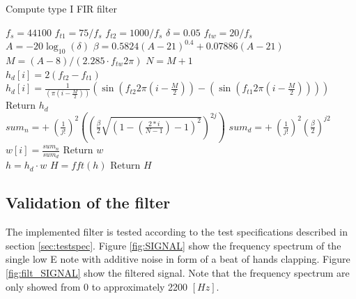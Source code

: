 \begin{algorithm}[H]
\caption{Compute type I FIR filter}
\label{alg:FIR}
\begin{algorithmic}[1] 
\State $f_s= 44100$ 
\State $f_{t1} = 75/f_s$ 
\State $f_{t2} = 1000/f_s$ 
\State $\delta = 0.05$  
\State $f_{tw} =20/ f_s$  
\\
\State $A=-20\log_{10}(\delta)$ 
\State $\beta = 0.5824(A-21)^{0.4} + 0.07886(A-21)$ 
\State $M = (A-8)/(2.285 \cdot f_{tw}  2\pi)$ 
\State $N = M+1$ 
\\
        		\State $h_d[i] = 2(f_{t2} - f_{t1})$
        	\Else 
        		\State  $h_d[i] = \frac{1}{ (\pi (i - \frac{M}{2}))}(\sin(f_{t2} 2 \pi (i - \frac{M}{2})) - (\sin(f_{t1} 2 \pi (i - \frac{M}{2}))))$ 
        	\EndIf 
	\EndFor
	\State Return $h_d$
\EndProcedure
\\
			\State $ sum_n = + \ (\frac{1}{j!})^2 \left( \left( \frac{\beta}{2} \sqrt{\left(1 - \left( \frac{2*i}{N-1}\right) - 1\right)^2}\right)^{2j}\right)$
			\State $ sum_d = + \ (\frac{1}{j!})^2 \left( \frac{\beta}{2}\right)^{j2}$
		\EndFor
		\State $w[i]=\frac{sum_n}{sum_d}$
	\EndFor
	\State Return $w$
\EndProcedure
\\
	\State $h = h_d \cdot w$ 
	\State $H = fft(h)$ 
	\State Return $H$
\EndProcedure

\end{algorithmic}
\end{algorithm}

\subsection{Validation of the filter}
The implemented filter is tested according to the test specifications described in section \ref{sec:testspec}. Figure \ref{fig:SIGNAL} show the frequency spectrum of the single low E note with additive noise in form of a beat of hands clapping. Figure \ref{fig:filt_SIGNAL} show the filtered signal. Note that the frequency spectrum are only showed from 0 to approximately 2200 $[Hz]$.  

